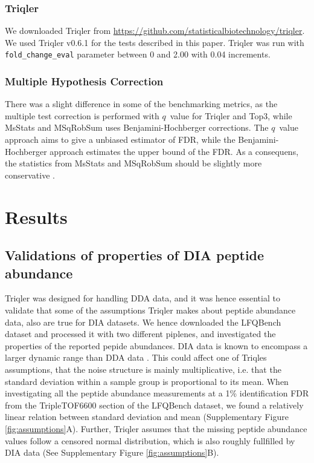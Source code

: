 \documentclass[10pt,letterpaper]{article}
\begin{document}

\subsubsection*{Triqler}

We downloaded Triqler from \url{https://github.com/statisticalbiotechnology/triqler}. We used Triqler v0.6.1 for the tests described in this paper. Triqler was run with \texttt{fold\_change\_eval} parameter between 0 and 2.00 with 0.04 increments.

\subsubsection*{Multiple Hypothesis Correction}
There was a slight difference in some of the benchmarking metrics, as the multiple test correction is performed with $q$~value for Triqler and Top3, while MsStats and MSqRobSum uses Benjamini-Hochberger \cite{benjamini1995controlling} corrections. The $q$~value approach aims to give a unbiased estimator of FDR, while the Benjamini-Hochberger approach estimates the upper bound of the FDR. As a consequens, the statistics from MsStats and MSqRobSum should be slightly more conservative \cite{korthauer2019practical}.



\section*{Results}



\subsection*{Validations of properties of DIA peptide abundance}

Triqler was designed for handling DDA data, and it was hence essential to validate that some of the assumptions Triqler makes about peptide abundance data, also are true for DIA datasets.
We hence downloaded the LFQBench dataset and processed it with two different piplenes, and investigated the properties of the reported pepide abundances. DIA data is known to encompass a larger dynamic range than DDA data . This could affect one of Triqles assumptions, that the noise structure is mainly multiplicative, i.e. that the standard deviation within a sample group is proportional to its mean. When investigating all the peptide abundance measurements at a 1\% identification FDR from the TripleTOF6600 section of the LFQBench dataset, we found a relatively linear relation between standard deviation and mean (Supplementary Figure \ref{fig:assumptions}A). Further, Triqler assumes that the missing peptide abundance values follow a censored normal distribution, which is also roughly fullfilled by DIA data (See Supplementary Figure \ref{fig:assumptions}B).
\end{document}
